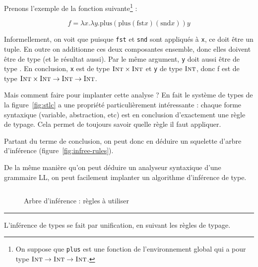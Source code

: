 Prenons l'exemple de la fonction suivante\footnote{ On suppose que \texttt{plus}
est une fonction de l'environnement global qui a pour type $\textsc{Int} \rightarrow
\textsc{Int} \rightarrow \textsc{Int}$.} :

\[
f = λx.λy. \textrm{plus} (\textrm{plus} (\textrm{fst} x) (\textrm{snd} x)) y
\]

Informellement, on voit que puisque \texttt{fst} et \texttt{snd} sont appliqués
à \texttt{x}, ce doit être un tuple. En outre on additionne ces deux composantes
ensemble, donc elles doivent être de type \tInt (et le résultat aussi). Par le
même argument, \texttt{y} doit aussi être de type \tInt. En conclusion,
\texttt{x} est de type $\textsc{Int} \times \textsc{Int}$ et \texttt{y} de type $\textsc{Int}$, donc
f est de type $\textsc{Int} \times \textsc{Int} \rightarrow \textsc{Int} \rightarrow \textsc{Int}$.

Mais comment faire pour implanter cette analyse ? En fait le système de types de
la figure~\ref{fig:stlc} a une propriété particulièrement intéressante : chaque forme
syntaxique (variable, abstraction, etc) est en conclusion d'exactement une règle
de typage. Cela permet de toujours savoir quelle règle il faut appliquer.

Partant du terme de conclusion, on peut donc en déduire un squelette d'arbre
d'inférence (figure~\ref{fig:infree-rules}).

De la
même manière qu'on peut déduire un analyseur syntaxique d'une grammaire LL, on
peut facilement implanter un algorithme d'inférence de type.

\begin{figure}
\[

\]
\caption{Arbre d'inférence : règles à utiliser}
\label{fig:inftree-rules}
\end{figure}

\begin{center}\rule{3in}{0.4pt}\end{center}

L'inférence de types se fait par unification, en suivant les règles de typage.



